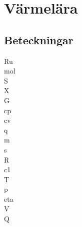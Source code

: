 \chapter{Värmelära}
\section*{Beteckningar}
\acrfull{Ru}\\
\acrfull{mol}\\
\acrfull{S}\\
\acrfull{X}\\
\acrfull{G}\\
\acrfull{cp}\\
\acrfull{cv}\\
\acrfull{q}\\
\acrfull{m}\\
\acrfull{s}\\
\acrfull{R}\\
\acrfull{c1}\\
\acrfull{T}\\
\acrfull{p}\\
\acrfull{eta}\\
\acrfull{V}\\
\acrfull{Q}

